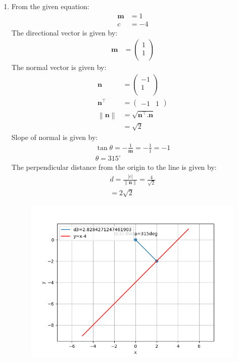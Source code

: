 \documentclass[12pt]{article}
\providecommand{\norm}[1]{\left\lVert#1\right\rVert}
\newcommand{\myvec}[1]{\ensuremath{\begin{pmatrix}#1\end{pmatrix}}}
\let\vec\mathbf
\begin{document}
\begin{enumerate}
	
\item From the given equation:
         \begin{align}                                    \vec{m}&=1\\                                  		c&=-4
         \end{align}                                                                                          The directional vector is given by:
          \begin{align}
                  \vec{m}&=\myvec{1\\1\\}
          \end{align}
          The normal vector is given by:
                  \begin{align}
         \vec{n}&=\myvec{-1\\1\\}\\
          \vec{n}^\top&=\myvec{-1 & 1}\\
                       \norm{\vec{n}}&=\sqrt{\vec{n}^\top.\vec{n}}\\
                          &=\sqrt{2}
                          \end{align}
          Slope of normal is given by:
		\begin{align}                                                                                                 \tan\theta=-\frac{1}{\vec{m}}=-\frac{1}{1}=-1\\                             \theta=315^\circ
                \end{align}                                                                                 The perpendicular distance from the origin to the line is given by:                                          \begin{align}
			d=\frac{|c|}{\norm{\vec{n}}}=\frac{4}{\sqrt{2}}\\=2\sqrt{2}                                                      
                  \end{align}

\begin{figure}[!h]
	\begin{center} 
	    \includegraphics[width=\columnwidth]{./figs/line3.png}
	\end{center}
\caption{}
\label{fig:Fig}
\end{figure}
\end{enumerate}
\end{document}
